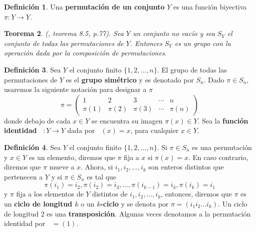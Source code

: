 \documentclass[12pt]{book}
\newtheorem{theorem}{Teorema}[section]
\theoremstyle{definition}
\newtheorem{definition}[theorem]{Definición}
\DeclareMathOperator{\im}{im}
\DeclareMathOperator{\idn}{id_{n}}
\newcounter{in}
\newcounter{ini}
\begin{document}

\begin{definition}
  Una \textbf{permutación de un conjunto} $Y$ es una función biyectiva
  $\pi:Y\rightarrow Y$.
\end{definition}

\begin{theorem}{\normalfont (\cite{fraleigh}, teorema 8.5, p.77)}.
  Sea $Y$ un conjunto no vacío y sea $S_{Y}$ el conjunto de todas las
  permutaciones de $Y$. Entonces $S_{Y}$ es un grupo con la operación dada por la composición de
  permutaciones.
\end{theorem}

\begin{definition}
  Sea $Y$ el conjunto finito $\{1,2,\ldots,n\}$. El grupo de todas las
  permutaciones de $Y$ es el\textbf{ grupo simétrico} y es denotado
  por $S_{n}$. Dado $\pi \in S_{n}$, usaremos la siguiente notación
  para designar a $\pi$
  \[ \pi=\left(
    \begin{array}{ccccc}
      1 & 2 & 3 & \cdots & n\\
      \pi(1) & \pi(2) & \pi(3) & \cdots & \pi(n) 
    \end{array} 
  \right)\] 
  donde debajo de cada $x\in Y$ se encuentra su imagen
  $\pi(x)\in Y$. Sea la \textbf{función identidad} $\idn:Y \rightarrow Y$ dada por $\idn(x)=x$, para cualquier $x\in Y$.
\end{definition}

\begin{definition}
  \label{trans}
  Sea $Y$ el conjunto finito $\{1,2,\ldots,n\}$. Si $\pi\in S_{n}$ es una permutación y
  $x\in Y$ es un elemento, diremos que $\pi$ fija a $x$ si
  $\pi(x)=x$. En caso contrario, diremos que $\pi$ mueve a $x$. Ahora,
  si $i_{1},i_{2},\ldots, i_{k}$ son enteros distintos que pertenecen a
  $Y$ y si $\pi\in S_{n}$ es tal que
  $$\pi(i_{1})=i_{2},\pi(i_{2})=i_{3},\ldots,\pi(i_{k-1})=i_{k},\pi(i_{k})=i_{1}$$
  y $\pi$ fija a los elementos de $Y$ distintos de
  $i_{1},i_{2},\ldots,i_{k}$, entonces,
  diremos que $\pi$ es un \textbf{ciclo de longitud $k$} o un
  \textbf{$k$-ciclo} y se denota por $\pi=(i_{1}i_{2}\dots i_{k})$. Un
  ciclo de longitud 2 es una \textbf{transposición}. Algunas veces
  denotamos a la permutación identidad por $\idn=(1)$.
\end{definition}
\end{document}
